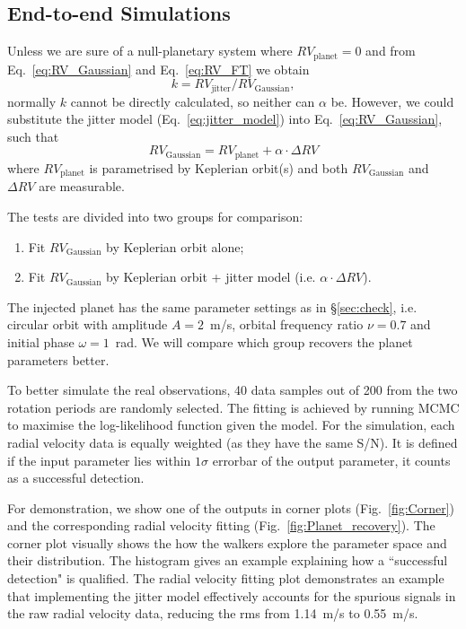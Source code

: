 \subsection{End-to-end Simulations}

Unless we are sure of a null-planetary system where $RV_\text{planet} = 0$ and
from Eq.~\ref{eq:RV_Gaussian} and Eq.~\ref{eq:RV_FT} we obtain
\begin{equation}
	k = RV_\text{jitter} / RV_\text{Gaussian},
\end{equation} 
normally $k$ cannot be directly calculated, so neither can $\alpha$ be.
However, we could substitute the jitter model (Eq.~\ref{eq:jitter_model}) into Eq.~\ref{eq:RV_Gaussian}, such that
\begin{equation}
	RV_\text{Gaussian} = RV_\text{planet} + \alpha \cdot \Delta RV
\label{eq:RV_fit}
\end{equation}
where $RV_\text{planet}$ is parametrised by Keplerian orbit(s) and both $RV_\text{Gaussian}$ and $\Delta RV$ 
are measurable. 

The tests are divided into two groups for comparison:
\begin{enumerate}
	\item Fit $RV_\text{Gaussian}$ by Keplerian orbit alone;
	\item Fit $RV_\text{Gaussian}$ by Keplerian orbit + jitter model (i.e. $\alpha \cdot \Delta RV$).
\end{enumerate}
The injected planet has the same parameter settings as in \S\ref{sec:check}, i.e. circular orbit with amplitude $A = 2$~m/s,
orbital frequency ratio $\nu = 0.7$ and initial phase $\omega = 1$~rad. We will compare which group recovers the 
planet parameters better. 

To better simulate the real observations, 40 data samples out of 200 from the two rotation periods are randomly selected.  
The fitting is achieved by running MCMC to maximise the log-likelihood function
given the model. For the simulation, each radial velocity data is equally weighted (as they have the same S/N). 
It is defined if the input parameter lies within $1\sigma$ errorbar of the output parameter, it counts as a 
successful detection. 

For demonstration, we show one of the outputs in corner plots (Fig.~\ref{fig:Corner}) and the corresponding 
radial velocity fitting (Fig.~\ref{fig:Planet_recovery}). The corner plot visually shows the how the walkers explore the parameter 
space and their distribution. The histogram gives an example explaining how a ``successful detection" is qualified. 
The radial velocity fitting plot demonstrates an example that implementing the jitter model effectively 
accounts for the spurious signals in the raw radial velocity data, reducing the rms from 1.14~m/s to 0.55~m/s. 

